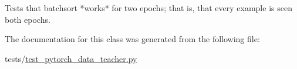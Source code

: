 \begin{DoxyVerb}Tests that batchsort *works* for two epochs; that is, that every example is seen
both epochs.
\end{DoxyVerb}
 

The documentation for this class was generated from the following file\+:\begin{DoxyCompactItemize}
\item 
tests/\hyperlink{test__pytorch__data__teacher_8py}{test\+\_\+pytorch\+\_\+data\+\_\+teacher.\+py}\end{DoxyCompactItemize}
